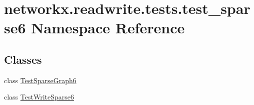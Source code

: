 \hypertarget{namespacenetworkx_1_1readwrite_1_1tests_1_1test__sparse6}{}\section{networkx.\+readwrite.\+tests.\+test\+\_\+sparse6 Namespace Reference}
\label{namespacenetworkx_1_1readwrite_1_1tests_1_1test__sparse6}
\subsection*{Classes}
\begin{DoxyCompactItemize}
\item 
class \hyperlink{classnetworkx_1_1readwrite_1_1tests_1_1test__sparse6_1_1TestSparseGraph6}{Test\+Sparse\+Graph6}
\item 
class \hyperlink{classnetworkx_1_1readwrite_1_1tests_1_1test__sparse6_1_1TestWriteSparse6}{Test\+Write\+Sparse6}
\end{DoxyCompactItemize}
